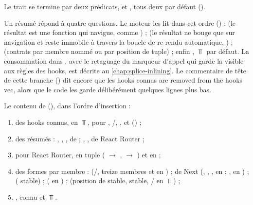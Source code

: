
Le trait se termine par deux prédicats,  et , tous deux  par défaut ().

Un résumé répond à quatre questions. Le moteur les lit dans cet ordre () :  (le résultat est une fonction qui navigue, comme ) ;  (le résultat ne bouge que sur navigation et reste immobile à travers la boucle de re-rendu automatique, ) ;  (contrats par membre nommé ou par position de tuple) ; enfin , $\Top$ par défaut. La consommation dans , avec le retaguage du marqueur d'appel qui garde la  visible aux règles des hooks, est décrite au \cref{chap:splice-inlining}. Le commentaire de tête de cette branche () dit encore que les hooks connus \og are removed from the hooks vec\fg{}, alors que le code les garde délibérément quelques lignes plus bas.

Le contenu de  (), dans l'ordre d'insertion :
\begin{enumerate}
  \item des hooks connus, en $\Top$, pour , /, ,  et  () ;
  \item des résumés  : , , ,  de  ; , ,  de React Router ;
  \item pour React Router,  en tuple ( $\to$ ,  $\to$ ) et  en  ;
  \item des formes par membre :  (/, treize membres  et  en ) ;  de Next (, , ,  en  ; ,  en ) ;  ( stable) ;  ( en ) ;  (position  de  stable,  stable, / en $\Top$) ;
  \item {}, connu et $\Top$.
\end{enumerate}

